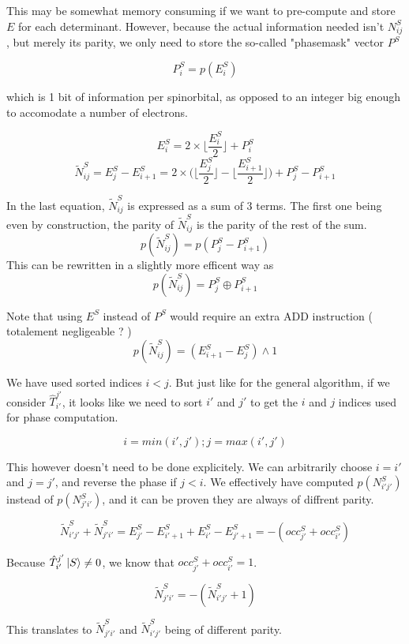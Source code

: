 \documentclass[./thesis.tex]{subfiles}
\begin{document}
This may be somewhat memory consuming if we want to pre-compute and store $E$ for each determinant. However, because the actual information needed isn't $N^S_{ij}$, but merely its parity, we only need to store the so-called "phasemask" vector $P^S$

$$P^S_i = p(E^S_i)$$

which is 1 bit of information per spinorbital, as opposed to an integer big enough to accomodate a number of electrons.
       
$$E^S_i = 2 \times  \lfloor \frac{E^S_i}2 \rfloor + P^S_i$$
$$\tilde N^S_{ij} = E^S_j - E^S_{i+1} = 2 \times \big ( \lfloor \frac{E^S_j}2 \rfloor - \lfloor \frac{E^S_{i+1}}2 \rfloor \big ) + P^S_j - P^S_{i+1}$$
	    
In the last equation, $\tilde N^S_{ij}$ is expressed as a sum of 3 terms. The first one being even by construction, the parity of $\tilde N^S_{ij}$ is the parity of the rest of the sum.
$$p(\tilde N^S_{ij})=p(P^S_j - P^S_{i+1})$$
This can be rewritten in a slightly more efficent way as
$$p(\tilde N^S_{ij}) = P^S_j \oplus P^S_{i+1}$$

Note that using $E^S$ instead of $P^S$ would require an extra ADD instruction ( totalement negligeable ? )
$$p(\tilde N^S_{ij}) = (E^S_{i+1} - E^S_j) \wedge 1$$

We have used sorted indices $i<j$. But just like for the general algorithm, if we consider $\hat T_{i'}^{j'}$, it looks like we need to sort $i'$ and $j'$ to get the $i$ and $j$ indices used for phase computation.

$$i=min(i', j') ; j=max(i', j')$$

This however doesn't need to be done explicitely. We can arbitrarily choose $i=i'$ and $j=j'$, and reverse the phase if $j<i$. We effectively have computed $p(N^S_{i'j'})$ instead of $p(N^S_{j'i'})$, and it can be proven they are always of diffrent parity.

$$\tilde N^{S}_{i' j'} + \tilde N^{S}_{j'i'} = E^{S}_{j'} - E^S_{i'+1} + E^S_{i'} - E^S_{j'+1} = -(occ^S_{j'} + occ^S_{i'})$$

Because $\hat T_{i'}^{j'} \ket S \neq 0$, we know that $occ^S_{j'} + occ^S_{i'} = 1$. 

$$\tilde N^{S}_{j' i'} = -(\tilde N^{S}_{i'j'} + 1)$$

This translates to $\tilde N^{S}_{j' i'}$ and $\tilde N^{S}_{i'j'}$ being of different parity.
\end{document}
